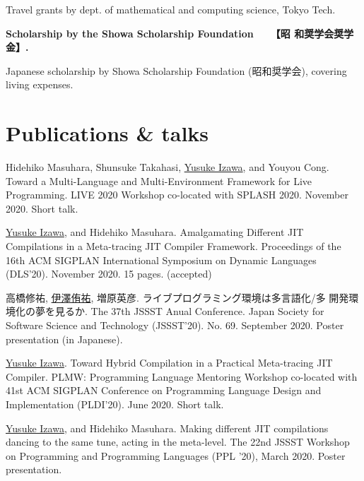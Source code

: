 \documentclass[11pt]{article} %
\newcommand{\YusukeIzawa}{\underline{Yusuke Izawa}}
\newcommand{\伊澤侑祐}{\underline{伊澤侑祐}}
\newcommand{\jit}{\textsc{JIT} }
\begin{document}
Travel grants by dept. of mathematical and computing science, Tokyo Tech.

\medskip


 \textbf{Scholarship by the Showa Scholarship Foundation~~~【昭
  和奨学会奨学金】.}

Japanese scholarship by Showa Scholarship Foundation (昭和奨学会), covering
living expenses.

\medskip


\section*{Publications \& talks}

 Hidehiko Masuhara, Shunsuke Takahasi, \YusukeIzawa, and Youyou
Cong. Toward a Multi-Language and Multi-Environment Framework for Live Programming.
LIVE 2020 Workshop co-located with SPLASH 2020. November 2020. Short talk.

 \YusukeIzawa, and Hidehiko Masuhara. Amalgamating Different \jit
Compilations in a Meta-tracing \jit Compiler Framework. Proceedings of the 16th ACM
SIGPLAN International Symposium on Dynamic Languages (DLS'20). November 2020. 15
pages. (accepted)
\medskip

 高橋修祐, \伊澤侑祐, 増原英彦. ライブプログラミング環境は多言語化/多
開発環境化の夢を見るか. The 37th JSSST Anual Conference. Japan Society for
Software Science and Technology (JSSST'20). No. 69. September 2020. Poster
presentation (in Japanese).
\medskip

 \YusukeIzawa. Toward Hybrid Compilation in a Practical Meta-tracing
\jit Compiler. PLMW: Programming Language Mentoring Workshop co-located with 41st
ACM SIGPLAN Conference on Programming Language Design and Implementation
(PLDI'20). June 2020. Short talk.
\medskip

 \YusukeIzawa, and Hidehiko Masuhara. Making different \jit
compilations dancing to the same tune, acting in the meta-level. The 22nd JSSST
Workshop on Programming and Programming Languages (PPL '20), March 2020. Poster
presentation.
\medskip
\end{document}
